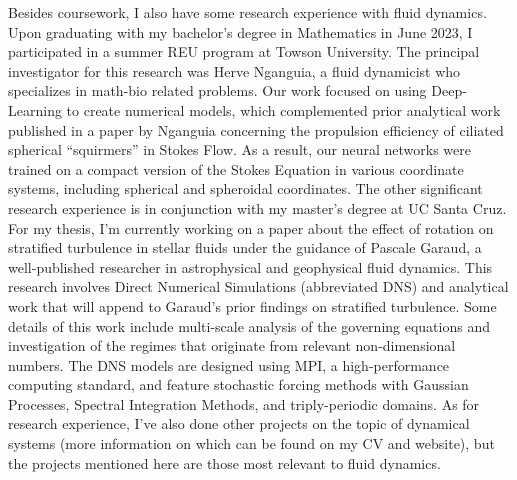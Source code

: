 \documentclass{article}
\begin{document}
Besides coursework, I also have some research experience with fluid dynamics. Upon graduating with my bachelor's degree in Mathematics in June 2023, I participated in a summer REU program at Towson University. The principal investigator for this research was Herve Nganguia, a fluid dynamicist who specializes in math-bio related problems. Our work focused on using Deep-Learning to create numerical models, which complemented prior analytical work published in a paper by Nganguia concerning the propulsion efficiency of ciliated spherical ``squirmers'' in Stokes Flow. As a result, our neural networks were trained on a compact version of the Stokes Equation in various coordinate systems, including spherical and spheroidal coordinates. The other significant research experience is in conjunction with my master's degree at UC Santa Cruz. For my thesis, I'm currently working on a paper about the effect of rotation on stratified turbulence in stellar fluids under the guidance of Pascale Garaud, a well-published researcher in astrophysical and geophysical fluid dynamics. This research involves Direct Numerical Simulations (abbreviated DNS) and analytical work that will append to Garaud's prior findings on stratified turbulence. Some details of this work include multi-scale analysis of the governing equations and investigation of the regimes that originate from relevant non-dimensional numbers. The DNS models are designed using MPI, a high-performance computing standard, and feature stochastic forcing methods with Gaussian Processes, Spectral Integration Methods, and triply-periodic domains. As for research experience, I've also done other projects on the topic of dynamical systems (more information on which can be found on my CV and website), but the projects mentioned here are those most relevant to fluid dynamics. 

\end{document}
